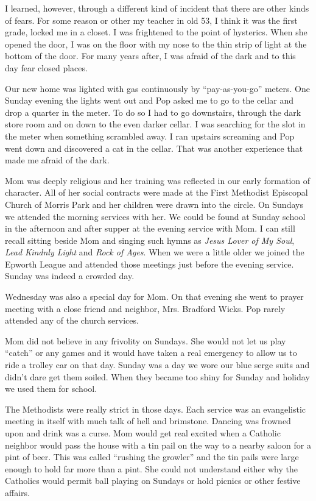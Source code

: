 \documentclass[12pt]{book}              %
\begin{document}
I learned, however, through a different kind of incident that there are other kinds of fears. For some reason or other my teacher in old 53, I think it was the first grade, locked me in a closet. I was frightened to the point of hysterics. When she opened the door, I was on the floor with my nose to the thin strip of light at the bottom of the door. For many years after, I was afraid of the dark and to this day fear closed places. 

Our new home was lighted with gas continuously by ``pay-as-you-go'' meters. One Sunday evening the lights went out and Pop asked me to go to the cellar and drop a quarter in the meter. To do so I had to go downstairs, through the dark store room and on down to the even darker cellar. I was searching for the slot in the meter when something scrambled away. I ran upstairs screaming and Pop went down and discovered a cat in the cellar. That was another experience that made me afraid of the dark.

Mom was deeply religious and her training was reflected in our early formation of character. All of her social contracts were made at the First Methodist Episcopal Church of Morris Park and her children were drawn into the circle. On Sundays we attended the morning services with her. We could be found at Sunday school in the afternoon and after supper at the evening service with Mom. I can still recall sitting beside Mom and singing such hymns as {\it Jesus Lover of My Soul}, {\it Lead Kindnly Light} and {\it Rock of Ages}. When we were a little older we joined the Epworth League and attended those meetings just before the evening service. Sunday was indeed a crowded day. 

Wednesday was also a special day for Mom. On that evening she went to prayer meeting with a close friend and neighbor, Mrs. Bradford Wicks. Pop rarely attended any of the church services. 

Mom did not believe in any frivolity on Sundays. She would not let us play ``catch'' or any games and it would have taken a real emergency to allow us to ride a trolley car on that day. Sunday was a day we wore our blue serge suits and didn't dare get them soiled. When they became too shiny for Sunday and holiday we used them for school. 

The Methodists were really strict in those days. Each service was an evangelistic meeting in itself with much talk of hell and brimstone. Dancing was frowned upon and drink was a curse. Mom would get real excited when a Catholic neighbor would pass the house with a tin pail on the way to a nearby saloon for a pint of beer. This was called ``rushing the growler'' and the tin pails were large enough to hold far more than a pint. She could not understand either why the Catholics would permit ball playing on Sundays or hold picnics or other festive affairs. 
\end{document}
